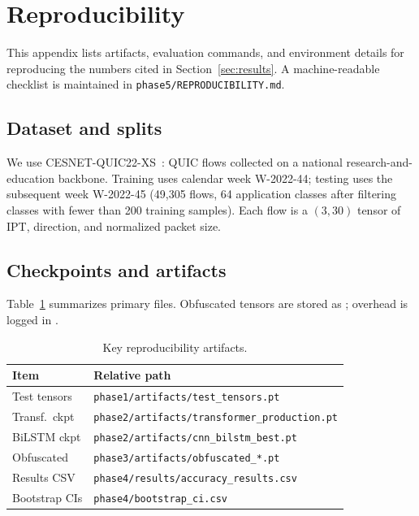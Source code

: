 \section{Reproducibility}
\label{app:repro}

This appendix lists artifacts, evaluation commands, and environment details for
reproducing the numbers cited in Section~\ref{sec:results}. A machine-readable
checklist is maintained in \texttt{phase5/REPRODUCIBILITY.md}.

\subsection{Dataset and splits}

We use CESNET-QUIC22-XS~\cite{cesnet_quic22}: QUIC flows collected on a national
research-and-education backbone. Training uses calendar week W-2022-44; testing uses
the subsequent week W-2022-45 (49{,}305 flows, 64 application classes after filtering
classes with fewer than 200 training samples). Each flow is a $(3,30)$ tensor of IPT,
direction, and normalized packet size.

\subsection{Checkpoints and artifacts}

Table~\ref{tab:repro} summarizes primary files. Obfuscated tensors are stored as
; overhead is logged in
.

\begin{table}[t]
  \centering
  \caption{Key reproducibility artifacts.}
  \label{tab:repro}
  \tiny
  \setlength{\tabcolsep}{2pt}
  \renewcommand{\arraystretch}{1.12}
  \begin{tabular}{@{}>{\raggedright\arraybackslash}p{}>{\raggedright\arraybackslash}p{}@{}}
    \toprule
    \textbf{Item} & \textbf{Relative path} \\
    \midrule
    Test tensors & \texttt{phase1/artifacts/test\_tensors.pt} \\
    Transf.\ ckpt & \texttt{phase2/artifacts/transformer\_production.pt} \\
    BiLSTM ckpt & \texttt{phase2/artifacts/cnn\_bilstm\_best.pt} \\
    Obfuscated & \texttt{phase3/artifacts/obfuscated\_*.pt} \\
    Results CSV & \texttt{phase4/results/accuracy\_results.csv} \\
    Bootstrap CIs & \texttt{phase4/bootstrap\_ci.csv} \\
    \bottomrule
  \end{tabular}
\end{table}

